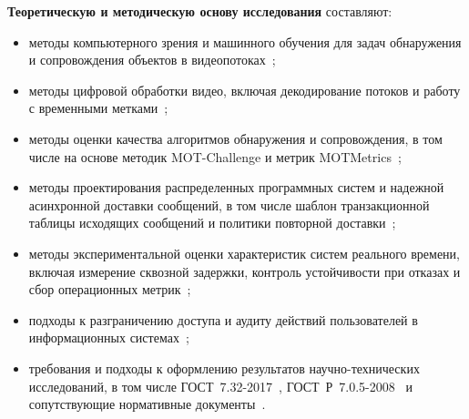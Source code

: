 \textbf{Теоретическую и методическую основу исследования} составляют:
\begin{itemize}
    \item методы компьютерного зрения и машинного обучения для задач обнаружения и сопровождения объектов в видеопотоках~\cite{redmon2016yolo,wojke2017deepsort,kalman1960};
    \item методы цифровой обработки видео, включая декодирование потоков и работу с временными метками~\cite{ffmpeg_docs,pyav_docs};
    \item методы оценки качества алгоритмов обнаружения и сопровождения, в том числе на основе методик MOT-Challenge и метрик MOTMetrics~\cite{bernardin2008motmetrics,motchallenge};
    \item методы проектирования распределенных программных систем и надежной асинхронной доставки сообщений, в том числе шаблон транзакционной таблицы исходящих сообщений и политики повторной доставки~\cite{richardson_microservices,transactional_outbox,rabbitmq_dlq};
    \item методы экспериментальной оценки характеристик систем реального времени, включая измерение сквозной задержки, контроль устойчивости при отказах и сбор операционных метрик~\cite{prometheus_docs,grafana_docs,iec_62676_6_2026};
    \item подходы к разграничению доступа и аудиту действий пользователей в информационных системах~\cite{nist_sp800_53r5};
    \item требования и подходы к оформлению результатов научно-технических исследований, в том числе ГОСТ~7.32-2017~\cite{gost_732_2017}, ГОСТ~Р~7.0.5-2008~\cite{gost_r_705_2008} и сопутствующие нормативные документы~\cite{gost_71_2003,gost_780_2000,gost_782_2001}.
\end{itemize}

